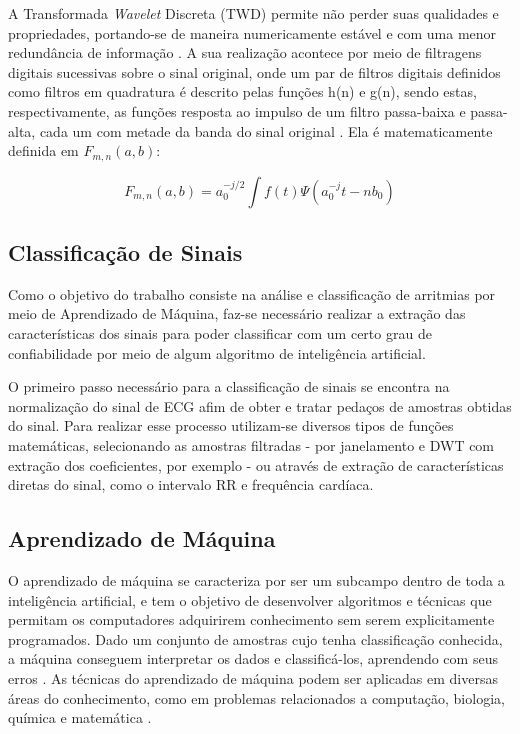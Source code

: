 \documentclass[conference]{IEEEtran}
\begin{document}
A Transformada \textit{Wavelet} Discreta (TWD) permite não perder suas qualidades e propriedades, portando-se de maneira numericamente estável e com uma menor redundância de informação \cite{silva06}. A sua realização acontece por meio de filtragens digitais sucessivas sobre o sinal
original, onde um par de filtros digitais definidos como filtros em quadratura é descrito pelas funções h(n) e g(n), sendo estas, respectivamente, as funções resposta ao impulso de um filtro passa-baixa e passa-alta, cada um com metade da banda do sinal original \cite{castelano06}. Ela é matematicamente definida em $F_{m,n}(a,b)$:

\[ 	F_{m,n}(a,b) = a_{0}^{-j/2}\int f(t)\Psi (a_{0}^{-j}t - nb_{0}) \]

\subsection{Classificação de Sinais}
Como o objetivo do trabalho consiste na análise e classificação de arritmias por meio de Aprendizado de Máquina, faz-se necessário realizar a extração das características dos sinais para poder classificar com um certo grau de confiabilidade por meio de algum algoritmo de inteligência artificial.

O primeiro passo necessário para a classificação de sinais se encontra na normalização do sinal de ECG afim de obter e tratar pedaços de amostras obtidas do sinal. Para realizar esse processo utilizam-se diversos tipos de funções matemáticas, selecionando as amostras filtradas - por janelamento e DWT com extração dos coeficientes, por exemplo - ou através de extração de características diretas do sinal, como o intervalo RR e frequência cardíaca.

\subsection{Aprendizado de Máquina}

O aprendizado de máquina se caracteriza por ser um subcampo dentro de toda a inteligência artificial, e tem o objetivo de desenvolver algoritmos e técnicas que permitam os computadores adquirirem conhecimento sem serem explicitamente programados. Dado um conjunto de amostras cujo tenha classificação conhecida, a máquina conseguem interpretar os dados e classificá-los, aprendendo com seus erros \cite{morellato08}. As técnicas do aprendizado de máquina podem ser aplicadas em diversas áreas do conhecimento, como em problemas relacionados a computação, biologia, química e matemática \cite{morellato08}.
\end{document}
